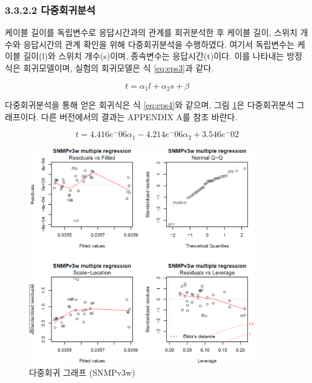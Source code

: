 \documentclass[11pt
  , a4paper
  , article
  , oneside
]{memoir}
\begin{document}
\clearpage

\subsubsection{3.3.2.2 다중회귀분석}
 케이블 길이를 독립변수로 응답시간과의 관계를 회귀분석한 후 케이블 길이, 스위치 개수와 응답시간의 관계 확인을 위해 다중회귀분석을 수행하였다. 여기서 독립변수는 케이블 길이(l)와 스위치 개수(s)이며, 종속변수는 응답시간(t)이다. 이를 나타내는 방정식은 회귀모델이며, 실험의 회귀모델은 식 \ref{eq:eps3}과 같다. 
 
 \begin{equation} \label{eq:eps3}
   t=\alpha_1 l + \alpha_2 s +\beta  
 \end{equation}
 
 다중회귀분석을 통해 얻은 회귀식은 식 \ref{eq:eps4}와 같으며, 그림 \ref{fig:multilinear_v3w}은 다중회귀분석 그래프이다. 다른 버전에서의 결과는 APPENDIX A를 참조 바란다. 
 
 \begin{equation} \label{eq:eps4}
   t=4.416e^-06\alpha_1 - 4.214e^-06\alpha_2 + 3.546e^-02 
 \end{equation}
 
 \begin{figure}[!h]
   \centering
   \includegraphics[width=0.88\textwidth]{./images/v3w.eps}
   \caption{다중회귀 그래프 (SNMPv3w)}
   \label{fig:multilinear_v3w}   
 \end{figure}
 
 
 
\end{document}
